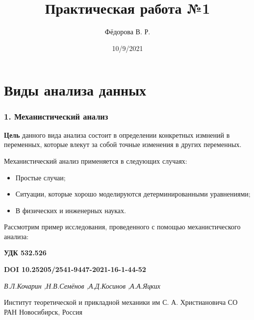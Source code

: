 \documentclass[
]{article}
\title{Практическая работа №1}
\author{Фёдорова В. Р.}
\date{10/9/2021}
\begin{document}
\maketitle

\hypertarget{ux432ux438ux434ux44b-ux430ux43dux430ux43bux438ux437ux430-ux434ux430ux43dux43dux44bux445}{%
\section{Виды анализа
данных}\label{ux432ux438ux434ux44b-ux430ux43dux430ux43bux438ux437ux430-ux434ux430ux43dux43dux44bux445}}

\hypertarget{ux43cux435ux445ux430ux43dux438ux441ux442ux438ux447ux435ux441ux43aux438ux439-ux430ux43dux430ux43bux438ux437}{%
\subsubsection{1. Механистический
анализ}\label{ux43cux435ux445ux430ux43dux438ux441ux442ux438ux447ux435ux441ux43aux438ux439-ux430ux43dux430ux43bux438ux437}}

\textbf{Цель} данного вида анализа состоит в определении конкретных
измнений в переменных, которые влекут за собой точные изменения в других
переменных.

Механистический анализ применяется в следующих случаях:

\begin{itemize}
\item
  Простые случаи;
\item
  Ситуации, которые хорошо моделируются детерминированными уравнениями;
\item
  В физических и инженерных науках.
\end{itemize}

Рассмотрим пример исследования, проведенного с помощью механистического
анализа:

\textbf{УДК 532.526}

\textbf{DOI 10.25205/2541-9447-2021-16-1-44-52}

\emph{В.Л.Кочарин ,Н.В.Семёнов ,А.Д.Косинов ,А.А.Яцких}

Институт теоретической и прикладной механики им С. А. Христиановича СО
РАН Новосибирск, Россия
\end{document}
